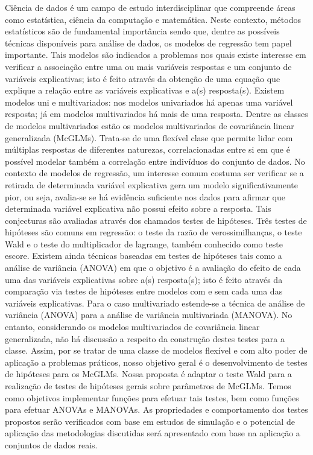 \begin{resumo}

Ciência de dados é um campo de estudo interdisciplinar que compreende áreas como estatística, ciência da computação e matemática. Neste contexto, métodos estatísticos são de fundamental importância sendo que, dentre as possíveis técnicas disponíveis para análise de dados, os modelos de regressão tem papel importante. Tais modelos são indicados a problemas nos quais existe interesse em verificar a associação entre uma ou mais variáveis respostas e um conjunto de variáveis explicativas; isto é feito através da obtenção de uma equação que explique a relação entre as variáveis explicativas e a(s) resposta(s). Existem modelos uni e multivariados: nos modelos univariados há apenas uma variável resposta; já em modelos multivariados há mais de uma resposta. Dentre as classes de modelos multivariados estão os modelos multivariados de covariância linear generalizada (McGLMs). Trata-se de uma flexível clase que permite lidar com múltiplas respostas de diferentes naturezas, correlacionadas entre si em que é possível modelar também a correlação entre indivíduos do conjunto de dados. No contexto de modelos de regressão, um interesse comum costuma ser verificar se a retirada de determinada variável explicativa gera um modelo significativamente pior, ou seja, avalia-se se há evidência suficiente nos dados para afirmar que determinada variável explicativa não possui efeito sobre a resposta. Tais conjecturas são avaliadas através dos chamados testes de hipóteses. Três testes de hipóteses são comuns em regressão: o teste da razão de verossimilhanças, o teste Wald e o teste do multiplicador de lagrange, também conhecido como teste escore. Existem ainda técnicas baseadas em testes de hipóteses tais como a análise de variância (ANOVA) em que o objetivo é a avaliação do efeito de cada uma das variáveis explicativas sobre a(s) resposta(s); isto é feito através da comparação via testes de hipóteses entre modelos com e sem cada uma das variáveis explicativas. Para o caso multivariado estende-se a técnica de análise de variância (ANOVA) para a análise de variância  multivariada (MANOVA). No entanto, considerando os modelos multivariados de covariância linear generalizada, não há discussão a respeito da construção destes testes para a classe. Assim, por se tratar de uma classe de modelos flexível e com alto poder de aplicação a problemas práticos, nosso objetivo geral é o desenvolvimento de testes de hipóteses para os McGLMs. Nossa proposta é adaptar o teste Wald para a realização de testes de hipóteses gerais sobre parâmetros de McGLMs. Temos como objetivos implementar funções para efetuar tais testes, bem como funções para efetuar ANOVAs e MANOVAs. As propriedades e comportamento dos testes propostos serão verificados com base em estudos de simulação e o potencial de aplicação das metodologias discutidas será apresentado com base na aplicação a conjuntos de dados reais.


\end{resumo}
